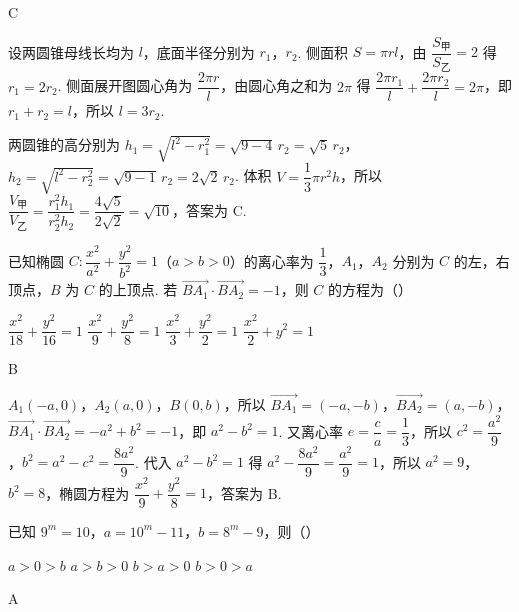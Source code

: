 \begin{answer}
C
\end{answer}

\begin{solution}
设两圆锥母线长均为 \(l\)，底面半径分别为 \(r_1\)，\(r_2\). 侧面积 \(S=\pi rl\)，由 \(\dfrac{S_{\text{甲}}}{S_{\text{乙}}}=2\) 得 \(r_1=2r_2\). 侧面展开图圆心角为 \(\dfrac{2\pi r}{l}\)，由圆心角之和为 \(2\pi\) 得 \(\dfrac{2\pi r_1}{l}+\dfrac{2\pi r_2}{l}=2\pi\)，即 \(r_1+r_2=l\)，所以 \(l=3r_2\).

两圆锥的高分别为 \(h_1=\sqrt{l^2-r_1^2}=\sqrt{9-4}\,r_2=\sqrt5\,r_2\)，\(h_2=\sqrt{l^2-r_2^2}=\sqrt{9-1}\,r_2=2\sqrt2\,r_2\). 体积 \(V=\dfrac13\pi r^2h\)，所以 \(\dfrac{V_{\text{甲}}}{V_{\text{乙}}}=\dfrac{r_1^2h_1}{r_2^2h_2}=\dfrac{4\sqrt5}{2\sqrt2}=\sqrt{10}\)，答案为 C.
\end{solution}

\begin{problem}
已知椭圆 \(C:\dfrac{x^2}{a^2}+\dfrac{y^2}{b^2}=1\)（\(a>b>0\)）的离心率为 \(\dfrac{1}{3}\)，\(A_1\)，\(A_2\) 分别为 \(C\) 的左，右顶点，\(B\) 为 \(C\) 的上顶点. 若 \(\overrightarrow{BA_1}\cdot\overrightarrow{BA_2}=-1\)，则 \(C\) 的方程为（\quad）

\choices
    {\(\dfrac{x^2}{18}+\dfrac{y^2}{16}=1\)}
    {\(\dfrac{x^2}{9}+\dfrac{y^2}{8}=1\)}
    {\(\dfrac{x^2}{3}+\dfrac{y^2}{2}=1\)}
    {\(\dfrac{x^2}{2}+y^2=1\)}
\end{problem}

\begin{answer}
B
\end{answer}

\begin{solution}
\(A_1(-a,0)\)，\(A_2(a,0)\)，\(B(0,b)\)，所以 \(\overrightarrow{BA_1}=(-a,-b)\)，\(\overrightarrow{BA_2}=(a,-b)\)，\(\overrightarrow{BA_1}\cdot\overrightarrow{BA_2}=-a^2+b^2=-1\)，即 \(a^2-b^2=1\). 又离心率 \(e=\dfrac ca=\dfrac13\)，所以 \(c^2=\dfrac{a^2}9\)，\(b^2=a^2-c^2=\dfrac{8a^2}9\). 代入 \(a^2-b^2=1\) 得 \(a^2-\dfrac{8a^2}9=\dfrac{a^2}9=1\)，所以 \(a^2=9\)，\(b^2=8\)，椭圆方程为 \(\dfrac{x^2}9+\dfrac{y^2}8=1\)，答案为 B.
\end{solution}

\begin{problem}
已知 \(9^m=10\)，\(a=10^m-11\)，\(b=8^m-9\)，则（\quad）

\choices
    {\(a>0>b\)}
    {\(a>b>0\)}
    {\(b>a>0\)}
    {\(b>0>a\)}
\end{problem}

\begin{answer}
A
\end{answer}


